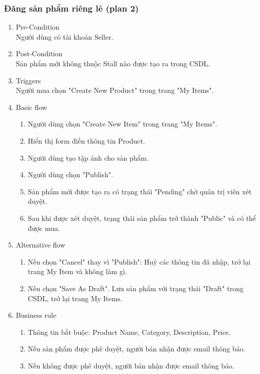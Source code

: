 \subsubsection{Đăng sản phẩm riêng lẻ (plan 2)}
\begin{enumerate}
	\item Pre-Condition\\
	Người dùng có tài khoản Seller.
	\item Post-Condition\\
	Sản phẩm mới không thuộc Stall nào được tạo ra trong CSDL.
	\item Triggers\\
	Người mua chọn "Create New Product" trong trang "My Items".
	\item Basic flow
	\begin{enumerate}
		\item Người dùng chọn "Create New Item" trong trang "My Items".
		\item Hiển thị form điền thông tin Product.
		\item Người dùng tạo tập ảnh cho sản phẩm.
		\item Người dùng chọn "Publish".
		\item Sản phẩm mới được tạo ra có trạng thái "Pending" chờ quản trị viên xét duyệt.
		\item Sau khi được xét duyệt, trạng thái sản phẩm trở thành "Public" và có thể được mua.
	\end{enumerate}
	\item Alternative flow
	\begin{enumerate}
		\item Nếu chọn "Cancel" thay vì "Publish": Huỷ các thông tin đã nhập, trở lại trang My Item và không làm gì.
		\item Nếu chọn "Save As Draft". Lưu sản phẩm với trạng thái "Draft" trong CSDL, trở lại trang My Items.
	\end{enumerate}
	\item Business rule
	\begin{enumerate}
		\item Thông tin bắt buộc: Product Name, Category, Description, Price.
		\item Nếu sản phẩm được phê duyệt, người bán nhận được email thông báo.
		\item Nếu không được phê duyệt, người bán nhận được email thông báo.
	\end{enumerate}
\end{enumerate}


